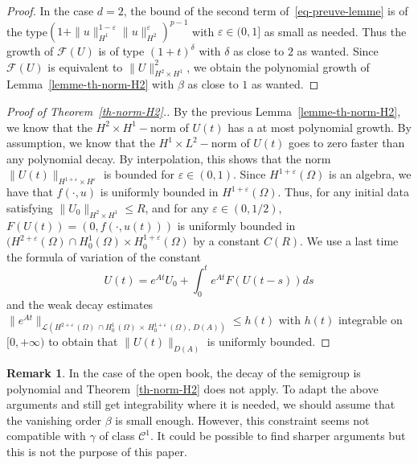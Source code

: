 \documentclass[10pt]{amsart}
\theoremstyle{definition}\newtheorem{defi}[theo]{Definition}\newtheorem{rema}[theo]{Remark}\newtheorem{exam}[theo]{Example}\newtheorem{exem}[theo]{Example}\newtheorem{nota}[theo]{Notation}
\newcommand{\Cc}{\mathcal{C}}
\newcommand{\Fc}{\mathcal{F}}
\newcommand{\Lc}{\mathcal{L}}
\begin{document}
\begin{proof}
In the case $d=2$, the bound of the second term of~\eqref{eq-preuve-lemme} is of the type\linebreak$(1+\|u\|_{H^1}^{1-\varepsilon}\|u\|_{H^2}^{\varepsilon})^{p-1}$ with $\varepsilon\in (0,1]$ as small as needed. Thus the growth of $\Fc(U)$ is of type $(1+t)^\delta$ with $\delta$ as close to $2$ as wanted. Since $\Fc(U)$ is equivalent to $\|U\|_{H^2\times H^1}^2$, we obtain the polynomial growth of Lemma~\ref{lemme-th-norm-H2} with $\beta$ as close to $1$ as wanted.
\end{proof}



\begin{proof}[{Proof of Theorem~\ref{th-norm-H2}.}]
By the previous Lemma~\ref{lemme-th-norm-H2}, we know that the $H^2\times H^1-$norm of $U(t)$ has a at most polynomial growth. By assumption, we know that the $H^1\times L^2-$norm of $U(t)$ goes to zero faster than any polynomial decay. By interpolation, this shows that the norm $\|U(t)\|_{H^{1+\varepsilon}\times H^\varepsilon}$ is bounded for $\varepsilon\in (0,1)$. Since $H^{1+\varepsilon}(\Omega)$ is an algebra, we have that $f(\cdot,u)$ is uniformly bounded in $H^{1+\varepsilon}(\Omega)$. Thus, for any initial data satisfying $\|U_0\|_{H^2\times H^1}\leq R$, and for any $\varepsilon \in (0,1/2)$, $F(U(t))=(0,f(\cdot,u(t)))$ is uniformly bounded in $(H^{2+\varepsilon}(\Omega)\cap H^1_0(\Omega)\times H^{1+\varepsilon}_0(\Omega)$ by a constant $C(R)$. We use a last time the formula of variation of the constant
\[
U(t)=e^{At}U_0 + \int_0^t e^{At} F(U(t-s)) ds
\]
and the weak decay estimates $\|e^{At}\|_{\Lc(H^{2+\varepsilon}\,(\Omega)\,\cap H^1_0\,(\Omega)\,\times\,H^{1+\varepsilon}_0\,(\Omega),\,D(A))}\leq h(t)$ with $h(t)$ integrable on $[0,+\infty)$ to obtain that $\|U(t)\|_{D(A)}$ is uniformly bounded. 
\end{proof}

\begin{rema}
In the case of the open book, the decay of the semigroup is polynomial and Theorem~\ref{th-norm-H2} does not apply. To adapt the above arguments and still get integrability where it is needed, we should assume that the vanishing order $\beta$ is small enough. However, this constraint seems not compatible with $\gamma$ of class $\Cc^1$. It could be possible to find sharper arguments but this is not the purpose of this paper.
\end{rema}



\appendix
\end{document}

